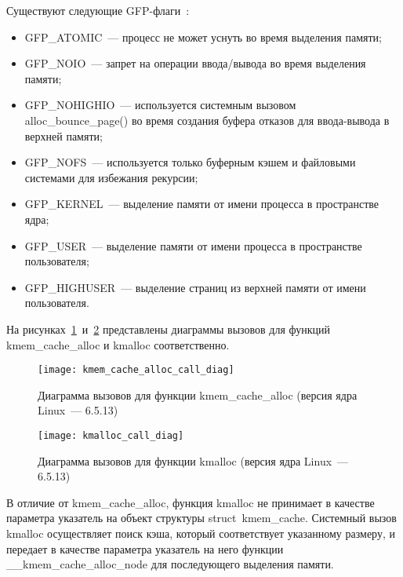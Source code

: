 Существуют следующие GFP-флаги~\cite{gfp}:
\begin{itemize}
	\item GFP\_ATOMIC~--- процесс не может уснуть во время выделения памяти;
	\item GFP\_NOIO~--- запрет на операции ввода/вывода во время выделения памяти;
	\item GFP\_NOHIGHIO~--- используется системным вызовом alloc\_bounce\_page() во время создания буфера отказов для ввода-вывода в верхней памяти;
	\item GFP\_NOFS~--- используется только буферным кэшем и файловыми системами для избежания рекурсии;
	\item GFP\_KERNEL~--- выделение памяти от имени процесса в пространстве ядра;
	\item GFP\_USER~--- выделение памяти от имени процесса в пространстве пользователя;
	\item GFP\_HIGHUSER~--- выделение страниц из верхней памяти от имени пользователя.
\end{itemize}

На рисунках~\ref{kmem_cache_alloc_call_diag}~и~\ref{kmalloc_call_diag} представлены диаграммы вызовов для функций kmem\_cache\_alloc и kmalloc соответственно.
\begin{figure}[H]
	\centering
	\texttt{[image: kmem\_cache\_alloc\_call\_diag]}
	\caption{Диаграмма вызовов для функции kmem\_cache\_alloc (версия ядра Linux~--- 6.5.13)}
	\label{kmem_cache_alloc_call_diag}
\end{figure}
\begin{figure}[H]
	\centering
	\texttt{[image: kmalloc\_call\_diag]}
	\caption{Диаграмма вызовов для функции kmalloc (версия ядра Linux~--- 6.5.13)}
	\label{kmalloc_call_diag}
\end{figure}

В отличие от kmem\_cache\_alloc, функция kmalloc не принимает в качестве параметра указатель на объект структуры struct~kmem\_cache.
Системный вызов kmalloc осуществляет поиск кэша, который соответствует указанному размеру, и передает в качестве параметра указатель на него функции \_\_kmem\_cache\_alloc\_node для последующего выделения памяти.

